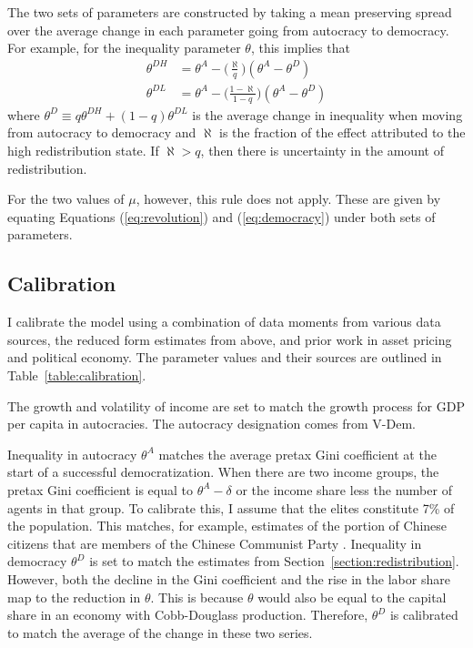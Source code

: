 \documentclass[12pt]{article}
\numberwithin{equation}{section}
\begin{document}
The two sets of parameters are constructed by taking a mean preserving spread over the average change in each parameter going from autocracy to democracy. For example, for the inequality parameter $\theta$, this implies that
\begin{align*}
\theta^{DH} & = \theta^A - \bigg(\frac{\aleph}{q}\bigg)(\theta^A-\theta^D) \\
\theta^{DL} & = \theta^A - \bigg(\frac{1-\aleph}{1-q}\bigg)(\theta^A-\theta^D) 
\end{align*}
where $\theta^D \equiv q \theta^{DH} + (1-q)\theta^{DL}$ is the average change in inequality when moving from autocracy to democracy and $\aleph$ is the fraction of the effect attributed to the high redistribution state. If $\aleph > q$, then there is uncertainty in the amount of redistribution. 

For the two values of $\mu$, however, this rule does not apply. These are given by equating Equations (\ref{eq:revolution}) and (\ref{eq:democracy}) under both sets of parameters.

\subsection{Calibration}

I calibrate the model using a combination of data moments from various data sources, the reduced form estimates from above, and prior work in asset pricing and political economy. The parameter values and their sources are outlined in Table~\ref{table:calibration}.

The growth and volatility of income are set to match the growth process for GDP per capita in autocracies. The autocracy designation comes from V-Dem. 

Inequality in autocracy $\theta^A$ matches the average pretax Gini coefficient at the start of a successful democratization. When there are two income groups, the pretax Gini coefficient is equal to $\theta^A-\delta$ or the income share less the number of agents in that group.  To calibrate this, I assume that the elites constitute 7\% of the population. This matches, for example, estimates of the portion of Chinese citizens that are members of the Chinese Communist Party \citep{Tian2021}. Inequality in democracy $\theta^D$ is set to match the estimates from Section~\ref{section:redistribution}. However, both the decline in the Gini coefficient and the rise in the labor share map to the reduction in $\theta$. This is because  $\theta$ would also be equal to the capital share in an economy with Cobb-Douglass production. Therefore, $\theta^D$ is calibrated to match the average of the change in these two series. 
\end{document}

